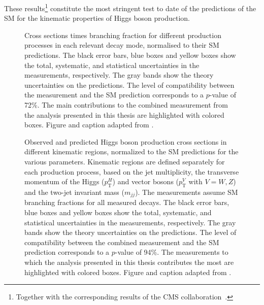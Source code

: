These results\footnote{Together with the corresponding results of the CMS collaboration~\cite{CMSNaturePaper}.} constitute the most stringent test to date of the predictions of the SM for the kinematic properties of Higgs boson production.
\begin{figure}
    \caption{Cross sections times branching fraction for different production processes in each relevant decay mode, normalised to their SM predictions. The black error bars, blue boxes and yellow boxes show the total, systematic, and statistical uncertainties in the measurements, respectively. The gray bands show the theory uncertainties on the predictions. The level of compatibility between the measurement and the SM prediction corresponds to a $p$-value of 72\%. 
    The main contributions to the combined measurement from the \HWW analysis presented in this thesis are highlighted with colored boxes. 
    Figure and caption adapted from .}
    \label{fig:prod-per-channel}
\end{figure}

\begin{figure}
    \caption{
      Observed and predicted Higgs boson production cross sections in different
    kinematic regions, normalized to the SM predictions for the various parameters. 
    Kinematic regions are defined separately for each production process, based on the jet multiplicity, the transverse momentum of the Higgs ($p_{\textrm{T}}^H$) and vector bosons ($p_{\textrm{T}}^V$ with $V = W, Z$) and the two-jet invariant mass ($m_{jj}$).
    The measurements assume SM branching fractions for all measured decays. The black error bars, blue boxes and yellow boxes show the total, systematic, and statistical uncertainties in the measurements, respectively. The gray bands show the theory uncertainties on the predictions. The level of compatibility between the combined measurement and the SM prediction corresponds to a $p$-value of 94\%. 
    The measurements to which the \HWW analysis presented in this thesis contributes the most are highlighted with colored boxes. 
    Figure and caption adapted from .
    }
    \label{fig:stxs-stage12}
  \end{figure}

